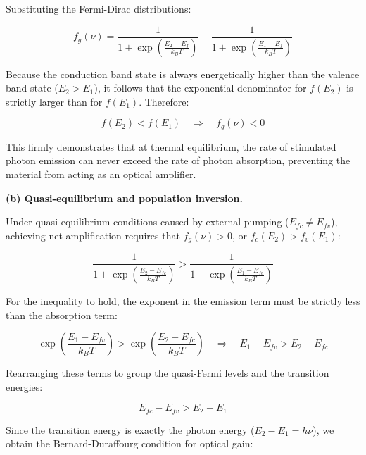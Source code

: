 Substituting the Fermi-Dirac distributions:

\begin{equation*}
  f_g(\nu) = \frac{1}{1 + \exp\left(\frac{E_2 - E_f}{k_B T}\right)} - \frac{1}{1 + \exp\left(\frac{E_1 - E_f}{k_B T}\right)}
\end{equation*}

Because the conduction band state is always energetically higher than the valence band state ($E_2 > E_1$), it follows that the exponential denominator for $f(E_2)$ is strictly larger than for $f(E_1)$. Therefore:

\begin{equation*}
  f(E_2) < f(E_1) \quad\Longrightarrow\quad f_g(\nu) < 0
\end{equation*}

This firmly demonstrates that at thermal equilibrium, the rate of stimulated photon emission can never exceed the rate of photon absorption, preventing the material from acting as an optical amplifier.

\textbf{(b) Quasi-equilibrium and population inversion.}

Under quasi-equilibrium conditions caused by external pumping ($E_{fc} \neq E_{fv}$), achieving net amplification requires that $f_g(\nu) > 0$, or $f_c(E_2) > f_v(E_1)$:

\begin{equation*}
  \frac{1}{1 + \exp\left(\frac{E_2 - E_{fc}}{k_B T}\right)} > \frac{1}{1 + \exp\left(\frac{E_1 - E_{fv}}{k_B T}\right)}
\end{equation*}

For the inequality to hold, the exponent in the emission term must be strictly less than the absorption term:

\begin{equation*}
  \exp\left(\frac{E_1 - E_{fv}}{k_B T}\right) > \exp\left(\frac{E_2 - E_{fc}}{k_B T}\right) \quad\Longrightarrow\quad E_1 - E_{fv} > E_2 - E_{fc}
\end{equation*}

Rearranging these terms to group the quasi-Fermi levels and the transition energies:

\begin{equation*}
  E_{fc} - E_{fv} > E_2 - E_1
\end{equation*}

Since the transition energy is exactly the photon energy ($E_2 - E_1 = h\nu$), we obtain the Bernard-Duraffourg condition for optical gain:


